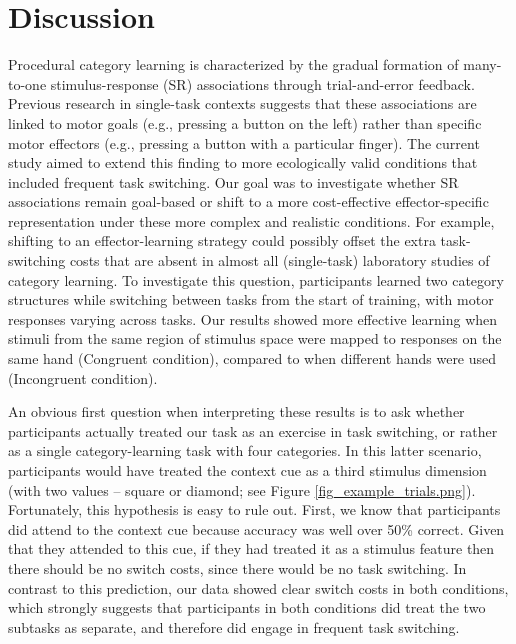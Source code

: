 \documentclass[doc, floatsintext]{apa7}
\begin{document}
\section{Discussion}
Procedural category learning is characterized by the gradual formation of many-to-one stimulus-response (SR) associations through trial-and-error feedback. Previous research in single-task
contexts suggests that these associations are linked to motor goals (e.g., pressing a button on the left) rather than specific motor effectors (e.g., pressing a button with a particular finger). The current study aimed to extend this finding to more ecologically valid conditions that included frequent task switching. Our goal was to investigate whether SR associations remain goal-based or shift to a more cost-effective effector-specific representation under these more complex and realistic conditions. For example, shifting to an effector-learning strategy could possibly offset the extra task-switching costs that are absent in almost all (single-task) laboratory studies of category learning. To investigate this question, participants learned two category structures while switching between tasks from the start of training, with motor responses varying across tasks. Our results showed more
effective learning when stimuli from the same region of stimulus space were mapped to responses on the same hand (Congruent condition), compared to when different hands were used (Incongruent condition).

An obvious first question when interpreting these results is to ask whether participants actually treated our task as an exercise in task switching, or rather as a single category-learning task with four categories. In this latter scenario, participants would have treated the context cue as a third stimulus dimension (with two values -- square or diamond; see Figure \ref{fig_example_trials.png}). Fortunately, this hypothesis is easy to rule out. First, we know that participants did attend to the context cue because accuracy was well over 50\% correct. Given that they attended to this cue, if they had treated it as a stimulus feature then there should be no switch costs, since there would be no task switching. In contrast to this prediction, our data showed clear switch costs in both conditions, which strongly suggests that participants in both conditions did treat the two subtasks as separate, and therefore did engage in frequent task switching. 
\end{document}
